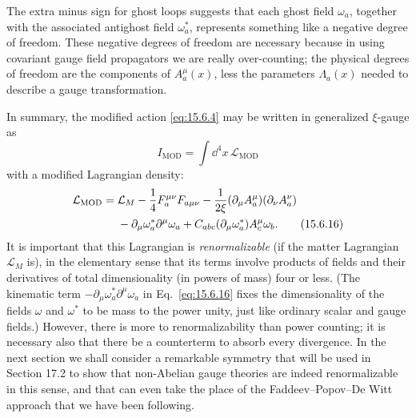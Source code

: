 The extra minus sign for ghost loops suggests that each ghost field
$\omega_a$, together with the associated antighost field
$\omega_a^*$, represents something like a negative degree of freedom.
These negative degrees of freedom are necessary because in using covariant
gauge field propagators we are really over-counting; the physical degrees of
freedom are the components of $A_a^\mu(x)$, less the parameters
$\Lambda_a(x)$ needed to describe a gauge transformation.

In summary, the modified action \eqref{eq:15.6.4} may be written in generalized
$\xi$-gauge as
\begin{equation}
  I_{\mathrm{MOD}}=\int \dd^4x\,\mathcal L_{\mathrm{MOD}}
  \tag{15.6.15}\label{eq:15.6.15}
\end{equation}
with a modified Lagrangian density:
\begin{align}
  \mathcal L_{\mathrm{MOD}}={}&\mathcal L_M
  -\frac14F_a^{\mu\nu}F_{a\mu\nu}
  -\frac{1}{2\xi}(\partial_\mu A_a^\mu)
  (\partial_\nu A_a^\nu)
  \notag\\
  &-\partial_\mu\omega_a^*\partial^\mu\omega_a
  +C_{abc}(\partial_\mu\omega_a^*)
  A_c^\mu\omega_b.
  \tag{15.6.16}\label{eq:15.6.16}
\end{align}
It is important that this Lagrangian is \emph{renormalizable} (if the matter
Lagrangian $\mathcal L_M$ is), in the elementary sense that its terms involve
products of fields and their derivatives of total dimensionality (in powers
of mass) four or less. (The kinematic term
$-\partial_\mu\omega_a^*\partial^\mu\omega_a$ in
Eq.~\eqref{eq:15.6.16} fixes the dimensionality of the fields $\omega$ and
$\omega^*$ to be mass to the power unity, just like ordinary scalar and gauge
fields.) However, there is more to renormalizability than power counting; it
is necessary also that there be a counterterm to absorb every divergence. In
the next section we shall consider a remarkable symmetry that will be used in
Section 17.2 to show that non-Abelian gauge theories are indeed renormalizable
in this sense, and that can even take the place of the Faddeev--Popov--De Witt
approach that we have been following.
